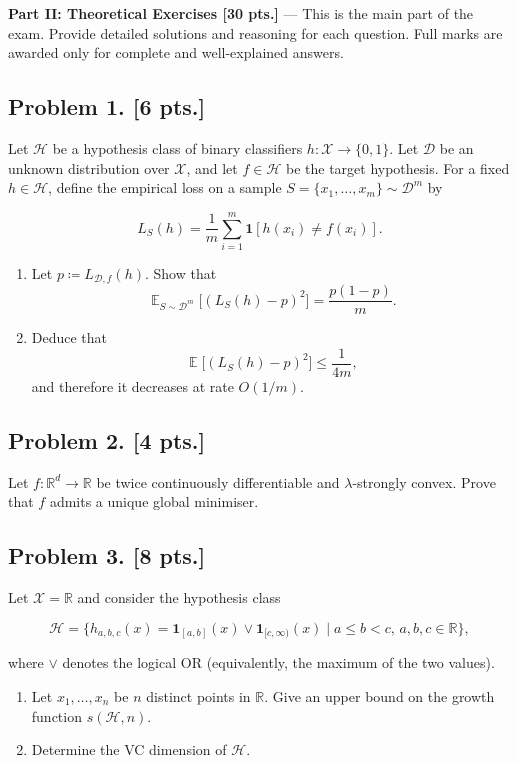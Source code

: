 \documentclass[11pt,a4paper]{article}
\DeclareMathOperator{\E}{\mathbb{E}}
\begin{document}
\noindent\textbf{Part II: Theoretical Exercises [30 pts.]} --- This is the main part of the exam. Provide detailed solutions and reasoning for each question. Full marks are awarded only for complete and well-explained answers.

\subsection{Problem 1. [6 pts.]}
Let $\mathcal{H}$ be a hypothesis class of binary classifiers $h : \mathcal{X} \to \{0, 1\}$. Let $\mathcal{D}$ be an unknown distribution over $\mathcal{X}$, and let $f \in \mathcal{H}$ be the target hypothesis.
For a fixed $h \in \mathcal{H}$, define the empirical loss on a sample $S = \{x_1, \dots, x_m\} \sim \mathcal{D}^{m}$ by

\[
L_S(h) = \frac{1}{m} \sum_{i=1}^{m} \mathbf{1}[h(x_i) \neq f(x_i)].
\]

\begin{enumerate}[label=(\alph*)]
    \item Let $p \coloneqq L_{\mathcal{D}, f}(h)$. Show that
    \[
    \E_{S \sim \mathcal{D}^{m}} \bigl[ (L_S(h) - p)^{2} \bigr] = \frac{p(1 - p)}{m}.
    \]
    \item Deduce that
    \[
    \E \bigl[ (L_S(h) - p)^{2} \bigr] \le \frac{1}{4m},
    \]
    and therefore it decreases at rate $O(1/m)$.
\end{enumerate}

\subsection{Problem 2. [4 pts.]}
Let $f : \mathbb{R}^{d} \to \mathbb{R}$ be twice continuously differentiable and $\lambda$-strongly convex. Prove that $f$ admits a unique global minimiser.

\subsection{Problem 3. [8 pts.]}
Let $\mathcal{X} = \mathbb{R}$ and consider the hypothesis class

\[
\mathcal{H} = \bigl\{ h_{a,b,c}(x) = \mathbf{1}_{[a,b]}(x) \lor \mathbf{1}_{[c,\infty)}(x) \mid a \le b < c,\, a, b, c \in \mathbb{R} \bigr\},
\]

where $\lor$ denotes the logical OR (equivalently, the maximum of the two values).
\begin{enumerate}[label=(\alph*)]
    \item Let $x_1, \dots, x_n$ be $n$ distinct points in $\mathbb{R}$. Give an upper bound on the growth function $s(\mathcal{H}, n)$.
    \item Determine the VC dimension of $\mathcal{H}$.
\end{enumerate}
\end{document}
